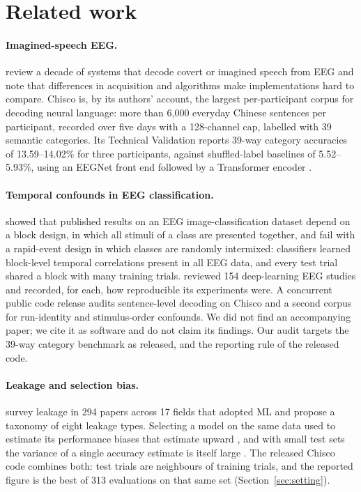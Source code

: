 \section{Related work}
\label{sec:related}

\paragraph{Imagined-speech EEG.}
\citet{panachakel2021} review a decade of systems that decode covert or imagined speech from EEG
and note that differences in acquisition and algorithms make implementations hard to compare.
Chisco \citep{zhang2024chisco} is, by its authors' account, the largest per-participant corpus for
decoding neural language: more than 6{,}000 everyday Chinese sentences per participant, recorded over five days with a 128-channel cap,
labelled with 39 semantic categories. Its Technical Validation reports 39-way category accuracies of
13.59--14.02\% for three participants, against shuffled-label baselines of 5.52--5.93\%, using an
EEGNet front end \citep{lawhern2018} followed by a Transformer encoder \citep{vaswani2017}.

\paragraph{Temporal confounds in EEG classification.}
\citet{li2021perils} showed that published results on an EEG image-classification dataset depend on
a block design, in which all stimuli of a class are presented together, and fail with a rapid-event
design in which classes are randomly intermixed: classifiers learned block-level temporal
correlations present in all EEG data, and every test trial shared a block with many training
trials. \citet{roy2019} reviewed 154 deep-learning EEG studies and recorded, for each, how
reproducible its experiments were. A concurrent public code release
\citep{concurrentaudit} audits sentence-level decoding on Chisco and a second corpus for run-identity
and stimulus-order confounds. We did not find an accompanying paper; we cite it as software and do
not claim its findings. Our audit targets the 39-way category benchmark as released, and the
reporting rule of the released code.

\paragraph{Leakage and selection bias.}
\citet{kapoor2023leakage} survey leakage in 294 papers across 17 fields that adopted ML and
propose a taxonomy of eight leakage types. Selecting a model on the same data used to estimate its performance biases that estimate upward
\citep{cawley2010}, and with small test sets the variance of a single accuracy estimate is itself
large \citep{varoquaux2018}. The released Chisco code combines both: test trials are neighbours of
training trials, and the reported figure is the best of 313 evaluations on that same set (Section~\ref{sec:setting}).
